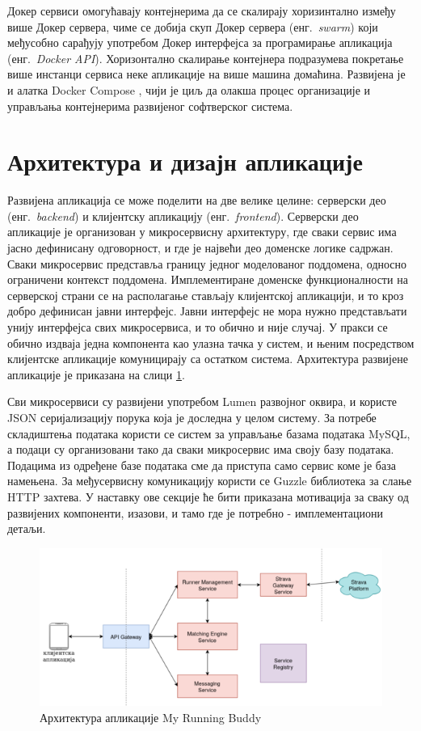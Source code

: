 \documentclass[12pt,oneside]{memoir}
\begin{document}
Докер сервиси омогућавају контејнерима да се скалирају хоризинтално између више Докер сервера, чиме се добија скуп Докер сервера (енг.~\textit{swarm}) који међусобно сарађују употребом Докер интерфејса за програмирање апликација (енг.~\textit{Docker API}). Хоризонтално скалирање контејнера подразумева покретање више инстанци сервиса неке апликације на више машина домаћина. Развијена је и алатка Docker Compose \cite{DockerCompose}, чији је циљ да олакша процес организације и управљања контејнерима развијеног софтверског система.

\section{Архитектура и дизајн апликације}
Развијена апликација се може поделити на две велике целине: серверски део (енг.~\textit{backend}) и клијентску апликацију (енг.~\textit{frontend}). Серверски део апликације је организован у микросервисну архитектуру, где сваки сервис има јасно дефинисану одговорност, и где је највећи део доменске логике садржан. Сваки микросервис представља границу једног моделованог поддомена, односно ограничени контекст поддомена. Имплементиране доменске функционалности на серверској страни се на располагање стављају клијентској апликацији, и то кроз добро дефинисан јавни интерфејс. Јавни интерфејс не мора нужно представљати унију интерфејса свих микросервиса, и то обично и није случај. У пракси се обично издваја једна компонента као улазна тачка у систем, и њеним посредством клијентске апликације комуницирају са остатком система. Архитектура развијене апликације је приказана на слици \ref{fig:my-running-buddy}.

Сви микросервиси су развијени употребом Lumen развојног оквира, и користе JSON серијализацију порука која је доследна у целом систему. За потребе складиштења података користи се систем за управљање базама података MySQL, а подаци су организовани тако да сваки микросервис има своју базу података. Подацима из одређене базе података сме да приступа само сервис коме је база намењена. За међусервисну комуникацију користи се Guzzle \cite{guzzle} библиотека за слање HTTP захтева. У наставку ове секције ће бити приказана мотивација за сваку од развијених компоненти, изазови, и тамо где је потребно - имплементациони детаљи.

\begin{figure}[!ht]
  \centering
  \includegraphics[scale=0.7]{slike/my-running-buddy.png}
  \caption{Архитектура апликације My Running Buddy}
  \label{fig:my-running-buddy}
\end{figure}
\end{document}
